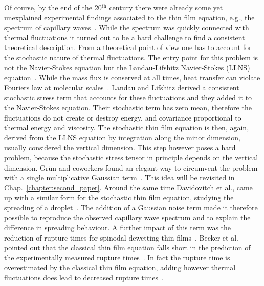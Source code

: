 Of course, by the end of the 20$^{\text{th}}$ century there were already some yet unexplained experimental findings associated to the thin film equation, e.g., the spectrum of capillary waves~\cite{vrijRuptureThinLiquid1968}.
While the spectrum was quickly connected with thermal fluctuations it turned out to be a hard challenge to find a consistent theoretical description.
From a theoretical point of view one has to account for the stochastic nature of thermal fluctuations.
The entry point for this problem is not the Navier-Stokes equation but the Landau-Lifshitz Navier-Stokes (LLNS) equation~\cite{landauFluidMechanicsLandau2013}.
While the mass flux is conserved at all times, heat transfer can violate Fouriers law at molecular scales~\cite{bellNumericalMethodsStochastic2007}.
Landau and Lifshitz derived a consistent stochastic stress term that accounts for these fluctuations and they added it to the Navier-Stokes equation.
Their stochastic term has zero mean, therefore the fluctuations do not create or destroy energy, and covariance proportional to thermal energy and viscosity. 
The stochastic thin film equation is then, again, derived from the LLNS equation by integration along the minor dimension, usually considered the vertical dimension.
This step however poses a hard problem, because the stochastic stress tensor in principle depends on the vertical dimension.
Grün and coworkers found an elegant way to circumvent the problem with a single multiplicative Gaussian term~\cite{grunThinFilmFlowInfluenced2006, meckeThermalFluctuationsThin2005, fetzerThermalNoiseInfluences2007, zhangNanoscaleThinfilmFlows2020, zhangMolecularSimulationThin2019, nesicFullyNonlinearDynamics2015}. 
This idea will be revisited in Chap.~\ref{chapter:second_paper}.
Around the same time Davidovitch et al., came up with a similar form for the stochastic thin film equation, studying the spreading of a droplet~\cite{davidovitchSpreadingViscousFluid2005}.
The addition of a Gaussian noise term made it therefore possible to reproduce the observed capillary wave spectrum and to explain the difference in spreading behaviour.
A further impact of this term was the reduction of rupture times for spinodal dewetting thin films~\cite{grunThinFilmFlowInfluenced2006, fetzerThermalNoiseInfluences2007}.
Becker et al. pointed out that the classical thin film equation falls short in the prediction of the experimentally measured rupture times~\cite{beckerComplexDewettingScenarios2003}.
In fact the rupture time is overestimated by the classical thin film equation, adding however thermal fluctuations does lead to decreased rupture times~\cite{duran-olivenciaInstabilityRuptureFluctuations2019, shahThermalFluctuationsCapillary2019}.

